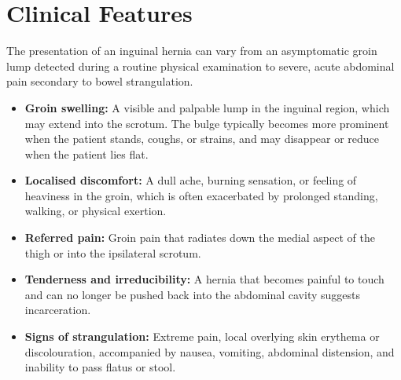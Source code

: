\section*{Clinical Features}
The presentation of an inguinal hernia can vary from an asymptomatic groin lump detected during a routine physical examination to severe, acute abdominal pain secondary to bowel strangulation.
\begin{itemize}
    \item \textbf{Groin swelling:} A visible and palpable lump in the inguinal region, which may extend into the scrotum. The bulge typically becomes more prominent when the patient stands, coughs, or strains, and may disappear or reduce when the patient lies flat.
    \item \textbf{Localised discomfort:} A dull ache, burning sensation, or feeling of heaviness in the groin, which is often exacerbated by prolonged standing, walking, or physical exertion.
    \item \textbf{Referred pain:} Groin pain that radiates down the medial aspect of the thigh or into the ipsilateral scrotum.
    \item \textbf{Tenderness and irreducibility:} A hernia that becomes painful to touch and can no longer be pushed back into the abdominal cavity suggests incarceration.
    \item \textbf{Signs of strangulation:} Extreme pain, local overlying skin erythema or discolouration, accompanied by nausea, vomiting, abdominal distension, and inability to pass flatus or stool.
\end{itemize}

